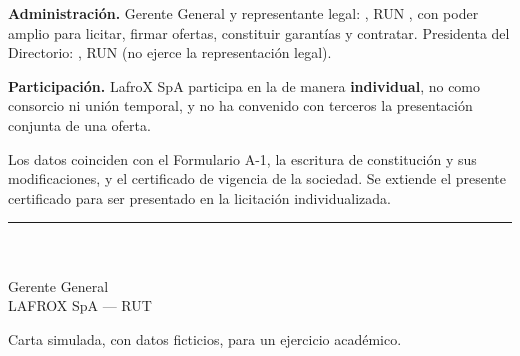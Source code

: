 \documentclass[11pt]{article}
\begin{document}
\textbf{Administración.} Gerente General y representante legal: \SIMgerente, RUN \SIMgerenterun, con poder amplio para licitar, firmar ofertas, constituir garantías y contratar. Presidenta del Directorio: \SIMpresidenta, RUN \SIMpresidentarun{} (no ejerce la representación legal).

\textbf{Participación.} LafroX SpA participa en la \LFXlicitacion{} de manera \textbf{individual}, no como consorcio ni unión temporal, y no ha convenido con terceros la presentación conjunta de una oferta.

Los datos coinciden con el Formulario A-1, la escritura de constitución y sus modificaciones, y el certificado de vigencia de la sociedad. Se extiende el presente certificado para ser presentado en la licitación individualizada.

\vspace{26pt}
\begin{center}
\rule{6cm}{0.5pt}\\
\SIMgerente\\Gerente General\\LAFROX SpA --- RUT \LFXrut
\end{center}

\vspace{4pt}
{\SIMsans\small\color{SIMgris}Carta simulada, con datos ficticios, para un ejercicio académico.}
\end{document}
